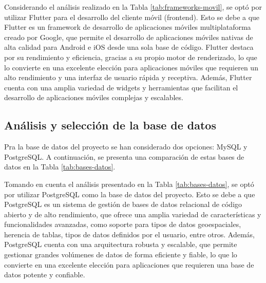 Considerando el análisis realizado en la Tabla \ref{tab:frameworks-movil}, se optó por utilizar Flutter para el
desarrollo del cliente móvil (frontend). Esto se debe a que Flutter es un framework de desarrollo de aplicaciones
móviles multiplataforma creado por Google, que permite el desarrollo de aplicaciones móviles nativas de alta
calidad para Android e iOS desde una sola base de código. Flutter destaca por su rendimiento y eficiencia, gracias
a su propio motor de renderizado, lo que lo convierte en una excelente elección para aplicaciones móviles que
requieren un alto rendimiento y una interfaz de usuario rápida y receptiva. Además, Flutter cuenta con una amplia
variedad de widgets y herramientas que facilitan el desarrollo de aplicaciones móviles complejas y escalables.

\subsection{Análisis y selección de la base de datos}

Pra la base de datos del proyecto se han considerado dos opciones: MySQL y PostgreSQL. A continuación, se presenta
una comparación de estas bases de datos en la Tabla \ref{tab:bases-datos}.



Tomando en cuenta el análisis presentado en la Tabla \ref{tab:bases-datos}, se optó por utilizar PostgreSQL como
la base de datos del proyecto. Esto se debe a que PostgreSQL es un sistema de gestión de bases de datos relacional
de código abierto y de alto rendimiento, que ofrece una amplia variedad de características y funcionalidades
avanzadas, como soporte para tipos de datos geoespaciales, herencia de tablas, tipos de datos definidos por el
usuario, entre otros. Además, PostgreSQL cuenta con una arquitectura robusta y escalable, que permite gestionar
grandes volúmenes de datos de forma eficiente y fiable, lo que lo convierte en una excelente elección para
aplicaciones que requieren una base de datos potente y confiable.